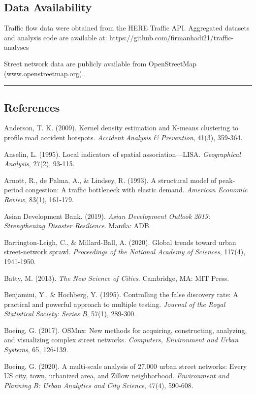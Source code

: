 \subsection{Data Availability}\label{data-availability}

Traffic flow data were obtained from the HERE Traffic API. Aggregated datasets and analysis code are available at: https://github.com/firmanhadi21/traffic-analyses

Street network data are publicly available from OpenStreetMap (www.openstreetmap.org).

\begin{center}\rule{0.5\linewidth}{0.5pt}\end{center}

\subsection{References}\label{references}

Anderson, T. K. (2009). Kernel density estimation and K-means clustering to profile road accident hotspots. \emph{Accident Analysis \& Prevention}, 41(3), 359-364.

Anselin, L. (1995). Local indicators of spatial association---LISA. \emph{Geographical Analysis}, 27(2), 93-115.

Arnott, R., de Palma, A., \& Lindsey, R. (1993). A structural model of peak-period congestion: A traffic bottleneck with elastic demand. \emph{American Economic Review}, 83(1), 161-179.

Asian Development Bank. (2019). \emph{Asian Development Outlook 2019: Strengthening Disaster Resilience}. Manila: ADB.

Barrington-Leigh, C., \& Millard-Ball, A. (2020). Global trends toward urban street-network sprawl. \emph{Proceedings of the National Academy of Sciences}, 117(4), 1941-1950.

Batty, M. (2013). \emph{The New Science of Cities}. Cambridge, MA: MIT Press.

Benjamini, Y., \& Hochberg, Y. (1995). Controlling the false discovery rate: A practical and powerful approach to multiple testing. \emph{Journal of the Royal Statistical Society: Series B}, 57(1), 289-300.

Boeing, G. (2017). OSMnx: New methods for acquiring, constructing, analyzing, and visualizing complex street networks. \emph{Computers, Environment and Urban Systems}, 65, 126-139.

Boeing, G. (2020). A multi-scale analysis of 27,000 urban street networks: Every US city, town, urbanized area, and Zillow neighborhood. \emph{Environment and Planning B: Urban Analytics and City Science}, 47(4), 590-608.

